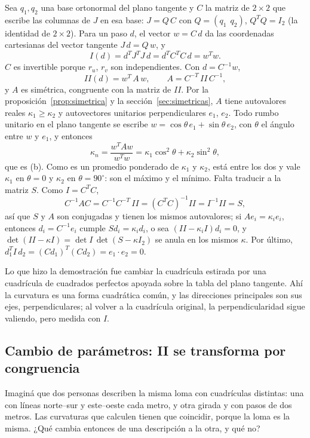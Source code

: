 \begin{demostracion}
Sea \(q_1,q_2\) una base ortonormal del plano tangente y \(C\) la matriz de \(2\times2\) que
escribe las columnas de \(J\) en esa base: \(J=Q\,C\) con \(Q=(q_1\ \ q_2)\), \(Q^TQ=I_2\) (la
identidad de \(2\times2\)). Para un paso \(d\), el vector \(w=C\,d\) da las coordenadas
cartesianas del vector tangente \(J\,d=Q\,w\), y
\[
  I(d)=d^TJ^TJ\,d=d^TC^TC\,d=w^Tw .
\]
\(C\) es invertible porque \(r_u\), \(r_v\) son independientes. Con \(d=C^{-1}w\),
\[
  II(d)=w^T\,A\,w,\qquad A=C^{-T}\,II\,C^{-1},
\]
y \(A\) es simétrica, congruente con la matriz de \(II\). Por la
proposición~\ref{prop:simetrica} y la sección~\ref{sec:simetricas}, \(A\) tiene autovalores
reales \(\kappa_1\ge\kappa_2\) y autovectores unitarios perpendiculares \(e_1\), \(e_2\). Todo
rumbo unitario en el plano tangente se escribe \(w=\cos\theta\,e_1+\sin\theta\,e_2\), con
\(\theta\) el ángulo entre \(w\) y \(e_1\), y entonces
\[
  \kappa_n=\frac{w^TAw}{w^Tw}=\kappa_1\cos^2\theta+\kappa_2\sin^2\theta ,
\]
que es (b). Como es un promedio ponderado de \(\kappa_1\) y \(\kappa_2\), está entre los dos y
vale \(\kappa_1\) en \(\theta=0\) y \(\kappa_2\) en \(\theta=90^\circ\): son el máximo y el
mínimo. Falta traducir a la matriz \(S\). Como \(I=C^TC\),
\[
  C^{-1}AC=C^{-1}C^{-T}\,II=(C^TC)^{-1}II=I^{-1}II=S,
\]
así que \(S\) y \(A\) son conjugadas y tienen los mismos autovalores; si \(Ae_i=\kappa_ie_i\),
entonces \(d_i=C^{-1}e_i\) cumple \(Sd_i=\kappa_id_i\), o sea \((II-\kappa_iI)d_i=0\), y
\(\det(II-\kappa I)=\det I\,\det(S-\kappa I_2)\) se anula en los mismos \(\kappa\). Por último,
\(d_1^TI\,d_2=(Cd_1)^T(Cd_2)=e_1\cdot e_2=0\).
\end{demostracion}

Lo que hizo la demostración fue cambiar la cuadrícula estirada por una cuadrícula de cuadrados
perfectos apoyada sobre la tabla del plano tangente. Ahí la curvatura es una forma cuadrática
común, y las direcciones principales son sus ejes, perpendiculares; al volver a la cuadrícula
original, la perpendicularidad sigue valiendo, pero medida con \(I\).

\subsection{Cambio de parámetros: II se transforma por congruencia}

Imaginá que dos personas describen la misma loma con cuadrículas distintas: una con líneas
norte--sur y este--oeste cada metro, y otra girada y con pasos de dos metros. Las curvaturas
que calculen tienen que coincidir, porque la loma es la misma. ¿Qué cambia entonces de una
descripción a la otra, y qué no?

